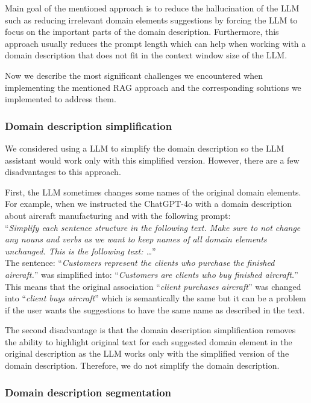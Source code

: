Main goal of the mentioned approach is to reduce the hallucination of the LLM such as reducing irrelevant domain elements suggestions by forcing the LLM to focus on the important parts of the domain description. Furthermore, this approach usually reduces the prompt length which can help when working with a domain description that does not fit in the context window size of the LLM.

Now we describe the most significant challenges we encountered when implementing the mentioned RAG approach and the corresponding solutions we implemented to address them.


\subsubsection{Domain description simplification}

We considered using a LLM to simplify the domain description so the LLM assistant would work only with this simplified version. However, there are a few disadvantages to this approach.

First, the LLM sometimes changes some names of the original domain elements. For example, when we instructed the ChatGPT-4o with a domain description about aircraft manufacturing and with the following prompt: \\

\noindent{}``\textit{Simplify each sentence structure in the following text. Make sure to not change any nouns and verbs as we want to keep names of all domain elements unchanged. This is the following text: \ldots}'' \\

\noindent{}The sentence: ``\textit{Customers represent the clients who purchase the finished aircraft.}'' was simplified into: ``\textit{Customers are clients who buy finished aircraft.}'' This means that the original association ``\textit{client purchases aircraft}'' was changed into ``\textit{client buys aircraft}'' which is semantically the same but it can be a problem if the user wants the suggestions to have the same name as described in the text.

The second disadvantage is that the domain description simplification removes the ability to highlight original text for each suggested domain element in the original description as the LLM works only with the simplified version of the domain description. Therefore, we do not simplify the domain description.


\subsubsection{Domain description segmentation}

